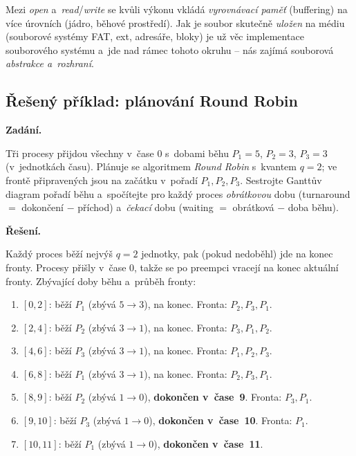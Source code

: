\begin{poznamka}
Mezi \emph{open} a~\emph{read}/\emph{write} se kvůli výkonu vkládá \emph{vyrovnávací paměť} (buffering) na více úrovních (jádro, běhové prostředí). Jak je soubor skutečně \emph{uložen} na médiu (souborové systémy FAT, ext, adresáře, bloky) je už věc implementace souborového systému a~jde nad rámec tohoto okruhu -- nás zajímá souborová \emph{abstrakce a~rozhraní}.
\end{poznamka}

\subsection{Řešený příklad: plánování Round Robin}

\begin{priklad}
\textbf{Zadání.}\par
Tři procesy přijdou všechny v~čase $0$ s~dobami běhu \mbox{$P_1=5$}, \mbox{$P_2=3$}, \mbox{$P_3=3$} (v~jednotkách času). Plánuje se algoritmem \emph{Round Robin} s~kvantem $q=2$; ve frontě připravených jsou na začátku v~pořadí $P_1,P_2,P_3$. Sestrojte Ganttův diagram pořadí běhu a~spočítejte pro každý proces \emph{obrátkovou} dobu (turnaround $=$ dokončení $-$ příchod) a~\emph{čekací} dobu (waiting $=$ obrátková $-$ doba běhu).

\medskip
\textbf{Řešení.}\par
Každý proces běží nejvýš $q=2$ jednotky, pak (pokud nedoběhl) jde na konec fronty. Procesy přišly v~čase $0$, takže se po preempci vracejí na konec aktuální fronty. Zbývající doby běhu a~průběh fronty:
\begin{enumerate}
\item $[0,2]$: běží $P_1$ (zbývá $5\to3$), na konec. Fronta: $P_2,P_3,P_1$.
\item $[2,4]$: běží $P_2$ (zbývá $3\to1$), na konec. Fronta: $P_3,P_1,P_2$.
\item $[4,6]$: běží $P_3$ (zbývá $3\to1$), na konec. Fronta: $P_1,P_2,P_3$.
\item $[6,8]$: běží $P_1$ (zbývá $3\to1$), na konec. Fronta: $P_2,P_3,P_1$.
\item $[8,9]$: běží $P_2$ (zbývá $1\to0$), \textbf{dokončen v~čase~9}. Fronta: $P_3,P_1$.
\item $[9,10]$: běží $P_3$ (zbývá $1\to0$), \textbf{dokončen v~čase~10}. Fronta: $P_1$.
\item $[10,11]$: běží $P_1$ (zbývá $1\to0$), \textbf{dokončen v~čase~11}.
\end{enumerate}


\end{priklad}
